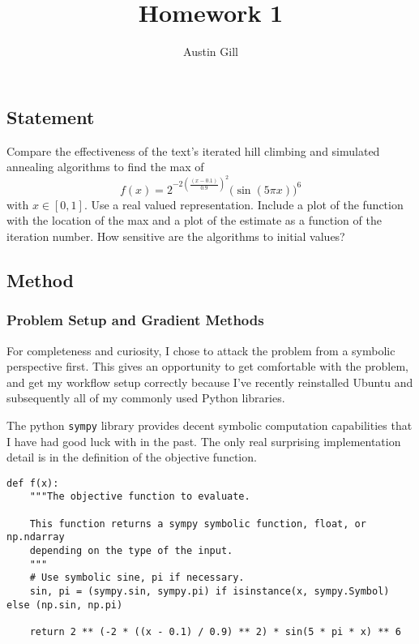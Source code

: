 \documentclass{article}
\title{Homework 1}
\author{Austin Gill}
\begin{document}
\maketitle


\section{}\label{prob:1}

\subsection{Statement}
Compare the effectiveness of the text's iterated hill climbing and simulated annealing algorithms
to find the max of
\[ f(x) = 2^{-2{\left(\frac{(x - 0.1)}{0.9}\right)}^2}{\big(\sin(5\pi x)\big)}^6\]
with $x\in [0,1]$. Use a real valued representation. Include a plot of the function with the
location of the max and a plot of the estimate as a function of the iteration number. How sensitive
are the algorithms to initial values?

\subsection{Method}

\subsubsection{Problem Setup and Gradient Methods}

For completeness and curiosity, I chose to attack the problem from a symbolic perspective first.
This gives an opportunity to get comfortable with the problem, and get my workflow setup correctly
because I've recently reinstalled Ubuntu and subsequently all of my commonly used Python libraries.

The python \texttt{sympy} library provides decent symbolic computation capabilities
that I have had good luck with in the past. The only real surprising implementation detail is in
the definition of the objective function.

\begin{verbatim}
def f(x):
    """The objective function to evaluate.

    This function returns a sympy symbolic function, float, or np.ndarray
    depending on the type of the input.
    """
    # Use symbolic sine, pi if necessary.
    sin, pi = (sympy.sin, sympy.pi) if isinstance(x, sympy.Symbol) else (np.sin, np.pi)

    return 2 ** (-2 * ((x - 0.1) / 0.9) ** 2) * sin(5 * pi * x) ** 6
\end{verbatim}
\end{document}

